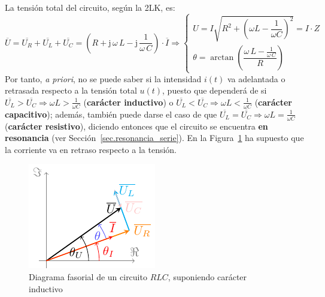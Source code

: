 La tensión total del circuito, según la 2LK, es:
\begin{equation*}
  \overline{U} = \overline{U_R} +\overline{U_L} + \overline{U_C} =\left(R+\mathrm{j}\,\omega\,L - \mathrm{j}\,\dfrac{1}{\omega\,C}\right) \cdot \overline{I}\Rightarrow 
  \begin{cases}
    U=I\sqrt{R^2 + \left(\omega L - \dfrac{1}{\omega C}\right)^2}=I\cdot Z\\
    \theta=\arctan\left( \dfrac{\omega\,L-\frac{1}{\omega\,C}}{R}\right)
  \end{cases}
\end{equation*}
Por tanto, \textit{a priori}, no se puede saber si la intensidad
$i(t)$ va {adelantada o retrasada} respecto a la tensión total $u(t)$,
puesto que dependerá de si
$\overline{U_L}>\overline{U_C}\Rightarrow \omega L>\frac{1}{\omega C}$
(\textbf{carácter inductivo}) o
$\overline{U_L}<\overline{U_C}\Rightarrow \omega L<\frac{1}{\omega C}$
(\textbf{carácter capacitivo}); además, también puede darse el caso de
que
$\overline{U_L}=\overline{U_C}\Rightarrow \omega L=\frac{1}{\omega C}$
(\textbf{carácter resistivo}), diciendo entonces que el circuito se
encuentra \textbf{en resonancia} (ver
Sección~\ref{sec.resonancia_serie}). En la
Figura~\ref{fig.fasorRLC_VI} ha supuesto que la corriente va en
retraso respecto a la tensión.
\begin{figure}[H]
  \centering
  \includegraphics[width=0.3\linewidth]{../figs/fasorRLC_VI.pdf}
  \caption{Diagrama fasorial de un circuito $RLC$, suponiendo carácter
    inductivo}
  \label{fig.fasorRLC_VI}
\end{figure}
	
	
	
